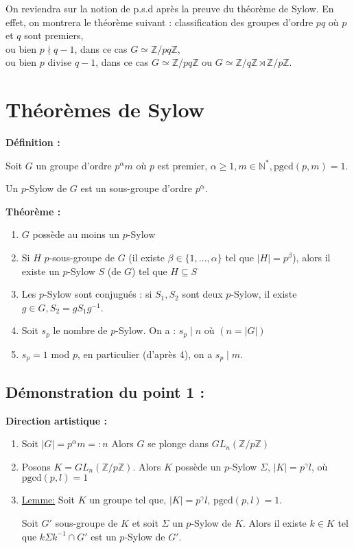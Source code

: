 \documentclass{report}
\newenvironment{definition}[1][]{
    \begin{tcolorbox}[colframe= white]
    \textbf{Définition :} 
    #1 \par
    }
    {\end{tcolorbox}}
\newenvironment{theoreme}[1][]{
    \begin{tcolorbox}[]
    \textbf{Théorème :} #1  \par} 
    {\end{tcolorbox}}
\newcommand{\N}{\mathbb{N}}
\newcommand{\Z}{\mathbb{Z}}
\newcommand{\dsp}{\displaystyle}
\begin{document}
On reviendra sur la notion de p.s.d après la preuve du théorème de Sylow. En effet, on montrera le théorème suivant : classification des groupes d'ordre $pq$ où $p$ et $q$ sont premiers,\\
ou bien $p \nmid q-1$, dans ce cas $G \simeq \Z / pq\Z$,\\
ou bien $p$ divise $q-1$, dans ce cas $G \simeq \Z / pq\Z$ ou $G \simeq \Z / q\Z \rtimes \Z / p\Z$.



\chapter{Théorèmes de Sylow}

\begin{definition}
    Soit $G$ un groupe d'ordre $p^{\alpha}m$ où $p$ est premier, $\alpha \geq 1, m \in \N^*, \text{pgcd}(p,m) = 1$.\par
    Un $p$-Sylow de $G$ est un sous-groupe d'ordre $p^{\alpha}$.
\end{definition}

\begin{theoreme}
    \begin{enumerate}
        \item $G$ possède au moins un $p$-Sylow
        \item Si $H$ $p$-sous-groupe de $G$ (il existe $\beta \in \{1,..., \alpha\}$ tel que $|H| = p^{\beta}$), alors il existe un $p$-Sylow $S$ (de $G$) tel que $H \subseteq S$
        \item Les $p$-Sylow sont conjugués : si $S_1, S_2$ sont deux $p$-Sylow, il existe $g \in G, S_2 = gS_1 g^{-1}$.
        \item Soit $s_p$ le nombre de $p$-Sylow. On a : $s_p \mid n$ où $(n = |G|)$
        \item $s_p = 1$ mod $p$, en particulier (d'après 4), on a $s_p \mid m$.
    \end{enumerate}
\end{theoreme}

\section{Démonstration du point 1 :}
\textbf{Direction artistique :}
    \begin{enumerate}[label=\roman*)]
        \item Soit $|G| = p^{\alpha}m =: n$ Alors $G$ se plonge dans $GL_n(\Z / p\Z)$
        \item Posons $K = GL_n(\Z / p\Z).$ Alors $K$ possède un $p$-Sylow $\dsp \Sigma$, $|K| = p^{\gamma}l$, où $\dsp \text{pgcd}(p,l) = 1$
    \item \underline{Lemme:} Soit $K$ un groupe tel que, $|K| = p^{\gamma}l$, $\text{pgcd}(p,l) = 1$.\par 
    Soit $G'$ sous-groupe de $K$ et soit $\Sigma$ un $p$-Sylow de $K$. Alors il existe $k \in K$ tel que $k \Sigma k^{-1} \cap G'$ est un $p$-Sylow de $G'$.
    \end{enumerate}
\end{document}
